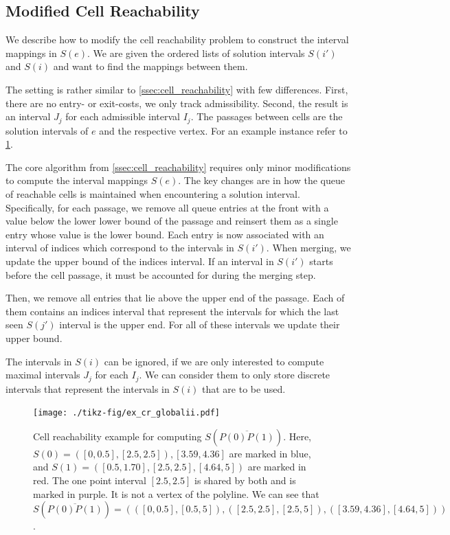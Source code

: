 \subsection{Modified Cell Reachability}
We describe how to modify the cell reachability problem to construct the interval mappings in \(S(e)\). We are given the ordered lists of solution intervals \(S(i')\) and \(S(i)\) and want to find the mappings between them. 

The setting is rather similar to \cref{ssec:cell_reachability} with few differences. First, there are no entry- or exit-costs, we only track admissibility. Second, the result is an interval \(J_j\) for each admissible interval \(I_j\). The passages between cells are the solution intervals of \(e\) and the respective vertex. For an example instance refer to \cref{fig:ex_cr_globalii}.

The core algorithm from \cref{ssec:cell_reachability} requires only minor modifications to compute the interval mappings \(S(e)\). The key changes are in how the queue of reachable cells is maintained when encountering a solution interval. Specifically, for each passage, we remove all queue entries at the front with a value below the lower lower bound of the passage and reinsert them as a single entry whose value is the lower bound. Each entry is now associated with an interval of indices which correspond to the intervals in \(S(i')\). When merging, we update the upper bound of the indices interval. If an interval in \(S(i')\) starts before the cell passage, it must be accounted for during the merging step.

Then, we remove all entries that lie above the upper end of the passage. Each of them contains an indices interval that represent  the intervals for which the last seen \(S(j')\) interval is the upper end. For all of these intervals we update their upper bound.

The intervals in \(S(i)\) can be ignored, if we are only interested to compute maximal intervals \(J_j\) for each \(I_j\). We can consider them to only store discrete intervals that represent the intervals in \(S(i)\) that are to be used.

\begin{figure}[htb]
  \centering
  \texttt{[image: ./tikz-fig/ex\_cr\_globalii.pdf]}
	\caption{Cell reachability example for computing \(S(\overline{P(0)P(1)})\). Here, \(S(0) = ([0, 0.5], [2.5, 2.5]), [3.59, 4.36]\) are marked in blue, and \(S(1) = ([0.5, 1.70], [2.5, 2.5], [4.64, 5])\) are marked in red. The one point interval \([2.5,2.5]\) is shared by both and is marked in purple. It is not a vertex of the polyline. We can see that \(S(\overline{P(0)P(1)}) = (([0,0.5], [0.5,5]), ([2.5,2.5],[2.5,5]), ([3.59,4.36],[4.64,5]))\).}
  \label{fig:ex_cr_globalii}
\end{figure}

